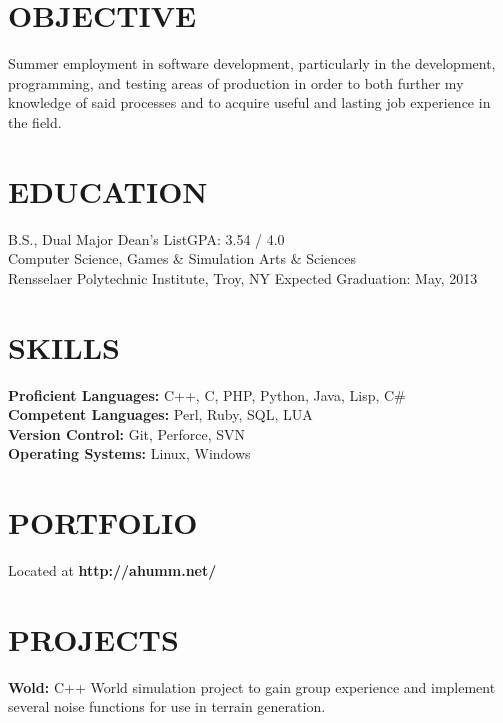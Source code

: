 \documentclass[margin,11pt]{res} %
\begin{document}

\address{{\bf Permanent Address} \\  9845 NE 27th st  \\ Bellevue, WA, 98004}
\address{ {\bf Contact Info} \\ talarsen@qwestoffice.net \\(425) 283-3847}

\begin{resume}
\section{OBJECTIVE}  
    Summer employment in software development, particularly in the development, programming, and testing areas of production in order to both further my knowledge of said processes and to acquire useful and lasting job experience in the field.

 
\section{EDUCATION}       B.S., Dual Major \hfill Dean's List\hfill GPA: 3.54 / 4.0 \\
                Computer Science, Games \& Simulation Arts \& Sciences  \\
                Rensselaer Polytechnic Institute, Troy, NY \hfill Expected Graduation: May, 2013
 
\section{SKILLS}       {\bf Proficient Languages:} C++, C, PHP, Python, Java, Lisp, C\# \\
                {\bf Competent Languages:} Perl, Ruby, SQL, LUA \\
                {\bf Version Control:} Git, Perforce, SVN \\
                {\bf Operating Systems:} Linux, Windows
 
\section{PORTFOLIO}      {Located at {\bf http://ahumm.net/}}

\section{PROJECTS}
                {{\bf Wold:} C++ World simulation project to gain group experience and implement several noise functions for use in terrain generation.}


\end{resume}
\end{document}
